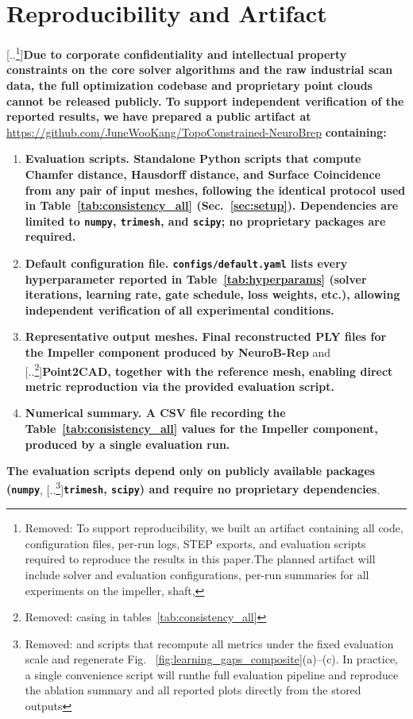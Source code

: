 \documentclass{ieeeaccess}
\providecommand{\DIFaddtex}[1]{{\color{blue}\bfseries #1}} %
\providecommand{\DIFdeltex}[1]{{\color{red}[..\footnote{\color{black}Removed: #1}]}} %
\providecommand{\DIFaddbegin}{} %
\providecommand{\DIFaddend}{} %
\providecommand{\DIFdelbegin}{} %
\providecommand{\DIFdelend}{} %
\providecommand{\DIFadd}[1]{\texorpdfstring{\DIFaddtex{#1}}{#1}} %
\providecommand{\DIFdel}[1]{\texorpdfstring{\DIFdeltex{#1}}{}} %
\begin{document}
\DIFaddend \section{Reproducibility and Artifact}
\label{sec:artifact}
\DIFdelbegin \DIFdel{To support reproducibility, we built an artifact containing all code,
configuration files, per-run logs, STEP exports, and evaluation scripts required 
to reproduce the results in this paper.The planned artifact will include solver 
and
evaluation configurations, per-run summaries for all experiments on the 
impeller,
shaft, }\DIFdelend \DIFaddbegin \DIFadd{Due to corporate confidentiality and intellectual property constraints
on the core solver algorithms and the raw industrial scan data,
the full optimization codebase and proprietary point clouds cannot be
released publicly.
To support independent verification of the reported results, we have
prepared a public artifact at
}\url{https://github.com/JuneWooKang/TopoConstrained-NeuroBrep}
\DIFadd{containing:
}\begin{enumerate}
  \item \DIFadd{\textbf{Evaluation scripts.} Standalone Python scripts that compute
        Chamfer distance, Hausdorff distance, and Surface Coincidence
        from any pair of input meshes, following the identical protocol
        used in Table~\ref{tab:consistency_all} (Sec.~\ref{sec:setup}).
        Dependencies are limited to \texttt{numpy}, \texttt{trimesh},
        and \texttt{scipy}; no proprietary packages are required.
  }\item \DIFadd{\textbf{Default configuration file.}
        \texttt{configs/default.yaml} lists every hyperparameter reported
        in Table~\ref{tab:hyperparams} (solver iterations, learning rate,
        gate schedule, loss weights, etc.), allowing independent
        verification of all experimental conditions.
  }\item \DIFadd{\textbf{Representative output meshes.} Final reconstructed PLY files
        for the Impeller component produced by NeuroB-Rep }\DIFaddend and \DIFdelbegin \DIFdel{casing in tables~\ref{tab:consistency_all} }\DIFdelend \DIFaddbegin \DIFadd{Point2CAD,
        together with the reference mesh, enabling direct metric
        reproduction via the provided evaluation script.
  }\item \DIFadd{\textbf{Numerical summary.} A CSV file recording the
        Table~\ref{tab:consistency_all} values for the Impeller component,
        produced by a single evaluation run.
}\end{enumerate}
\DIFadd{The evaluation scripts depend only on publicly available packages
(\texttt{numpy}}\DIFaddend , \DIFdelbegin \DIFdel{and scripts that recompute all metrics 
under the fixed evaluation scale and regenerate Fig.
  ~\ref{fig:learning_gaps_composite}(a)–(c).
  In practice,
        a 
single convenience script will runthe full evaluation pipeline and reproduce the 
ablation summary and all reported plots directly from the stored outputs}\DIFdelend \DIFaddbegin \DIFadd{\texttt{trimesh}, \texttt{scipy}) and require no
proprietary dependencies}\DIFaddend .
\end{document}
